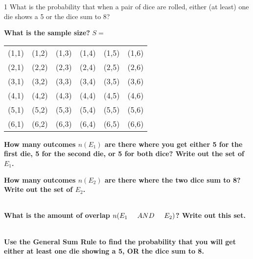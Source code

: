 \documentclass[a4paper,12pt]{book}
\newcounter{question}
\begin{document}
        \begin{question}{\thequestion}{1}
            What is the probability that when a pair of dice are rolled,
            either (at least) one die shows a 5 or the dice sum to 8?
            
            \textbf{What is the sample size?} \tab $S = $ 
            
            \begin{center}
            	\begin{tabular}{c c c c c c}
            		(1,1) & (1,2) & (1,3) & (1,4) & (1,5) & (1,6) \\
						(2,1) & (2,2) & (2,3) & (2,4) & (2,5) & (2,6) \\
            		(3,1) & (3,2) & (3,3) & (3,4) & (3,5) & (3,6) \\
						(4,1) & (4,2) & (4,3) & (4,4) & (4,5) & (4,6) \\
            		(5,1) & (5,2) & (5,3) & (5,4) & (5,5) & (5,6) \\
						(6,1) & (6,2) & (6,3) & (6,4) & (6,5) & (6,6)
            	\end{tabular}
            \end{center}
            
            
            \textbf{How many outcomes $n(E_1)$ are there where you get either 5 for the first die, 5 for the second die, or 5 for both dice? Write out the set of $E_1$.}
            ~\\
            
				\textbf{How many outcomes $n(E_2)$ are there where the two dice sum to 8? Write out the set of $E_2$.} ~\\
				{~\\}
				
				\textbf{What is the amount of overlap $n(E_1 \tab[0.5cm]AND\tab[0.5cm] E_2)$? Write out this set.} ~\\
				
				\textbf{Use the General Sum Rule to find the probability that you will get either
					at least one die showing a 5, OR the dice sum to 8.}

        \end{question}
\end{document}
